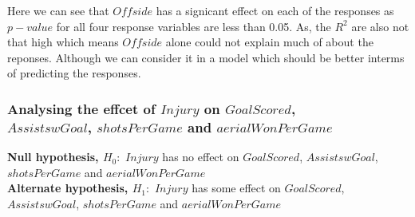 \documentclass[12pt]{article}
\begin{document}
Here we can see that $ Offside $ has a signicant effect on each of the responses as $ p-value $ for all four response variables are less than 0.05. As, the $ R^2 $ are also not that high which means $ Offside $ alone could not explain much of about the reponses. Although we can consider it in a model which should be better interms of predicting the responses.

\newpage

\subsubsection{Analysing the effcet of $ Injury $ on $ GoalScored $, \\ $ AssistswGoal $, $ shotsPerGame $ and $ aerialWonPerGame $}

\textbf{Null hypothesis, $ H_0: $} $ Injury $ has no effect on $ GoalScored $, $ AssistswGoal $, $ shotsPerGame $ and $ aerialWonPerGame $\\
\textbf{Alternate hypothesis, $ H_1: $} $ Injury $ has some effect on $ GoalScored $, $ AssistswGoal $, $ shotsPerGame $ and $ aerialWonPerGame $
\end{document}
